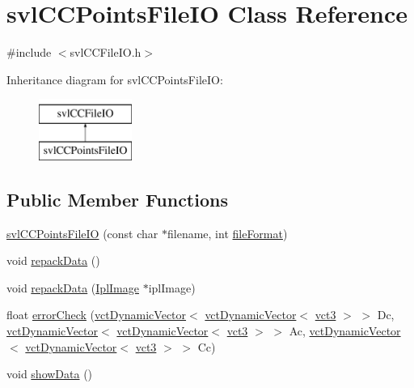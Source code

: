 \hypertarget{classsvl_c_c_points_file_i_o}{}\section{svl\+C\+C\+Points\+File\+I\+O Class Reference}
\label{classsvl_c_c_points_file_i_o}


{\ttfamily \#include $<$svl\+C\+C\+File\+I\+O.\+h$>$}

Inheritance diagram for svl\+C\+C\+Points\+File\+I\+O\+:\begin{figure}[H]
\begin{center}
\leavevmode
\includegraphics[height=2.000000cm]{d5/d82/classsvl_c_c_points_file_i_o}
\end{center}
\end{figure}
\subsection*{Public Member Functions}
\begin{DoxyCompactItemize}
\item 
\hyperlink{classsvl_c_c_points_file_i_o_a17efbaeedda9d7c97110d0faedbbb2d3}{svl\+C\+C\+Points\+File\+I\+O} (const char $\ast$filename, int \hyperlink{classsvl_c_c_file_i_o_a909643473f103610ef3e3c2f6cc8ab36}{file\+Format})
\item 
void \hyperlink{classsvl_c_c_points_file_i_o_ab7f778789bd5899b73c1d496723a9090}{repack\+Data} ()
\item 
void \hyperlink{classsvl_c_c_points_file_i_o_a149ef96b2b9aafa736a0f7287f091765}{repack\+Data} (\hyperlink{svl_types_8h_aa5a40a13021ba9708bfe921e18fdfa53}{Ipl\+Image} $\ast$ipl\+Image)
\item 
float \hyperlink{classsvl_c_c_points_file_i_o_acaa27bf644becdff6a54c94424179782}{error\+Check} (\hyperlink{classvct_dynamic_vector}{vct\+Dynamic\+Vector}$<$ \hyperlink{classvct_dynamic_vector}{vct\+Dynamic\+Vector}$<$ \hyperlink{vct_fixed_size_vector_types_8h_a3af82acdbf4eeb73c551909240b106ea}{vct3} $>$ $>$ Dc, \hyperlink{classvct_dynamic_vector}{vct\+Dynamic\+Vector}$<$ \hyperlink{classvct_dynamic_vector}{vct\+Dynamic\+Vector}$<$ \hyperlink{vct_fixed_size_vector_types_8h_a3af82acdbf4eeb73c551909240b106ea}{vct3} $>$ $>$ Ac, \hyperlink{classvct_dynamic_vector}{vct\+Dynamic\+Vector}$<$ \hyperlink{classvct_dynamic_vector}{vct\+Dynamic\+Vector}$<$ \hyperlink{vct_fixed_size_vector_types_8h_a3af82acdbf4eeb73c551909240b106ea}{vct3} $>$ $>$ Cc)
\item 
void \hyperlink{classsvl_c_c_points_file_i_o_adfccb5f8adf54c4d1f3a1130b91e5fcf}{show\+Data} ()
\end{DoxyCompactItemize}
